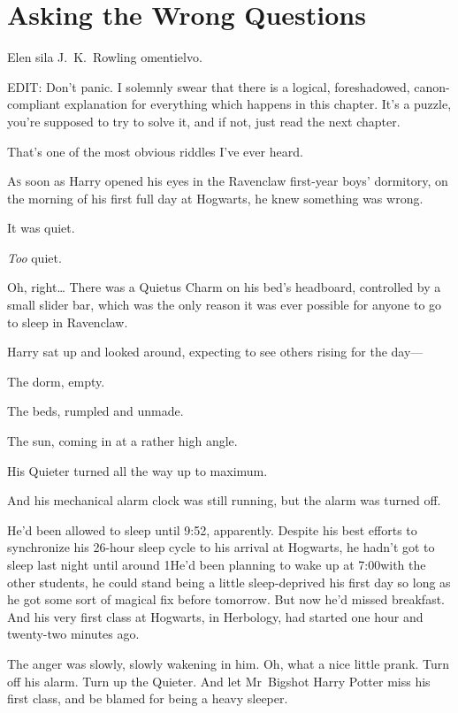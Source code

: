 \chapter{Asking the Wrong Questions}

\begin{chapterOpeningAuthorNote}
Elen sila J.~K.~Rowling omentielvo.

EDIT: Don't panic. I solemnly swear that there is a logical, foreshadowed, canon-compliant explanation for everything which happens in this chapter. It's a puzzle, you're supposed to try to solve it, and if not, just read the next chapter.
\end{chapterOpeningAuthorNote}
\begin{chapterOpeningQuote}
That's one of the most obvious riddles I've ever heard.
\end{chapterOpeningQuote}

\lettrine{A}{s} soon as Harry opened his eyes in the Ravenclaw first-year boys' dormitory, on the morning of his first full day at Hogwarts, he knew something was wrong.

It was quiet.

\emph{Too} quiet.

Oh, right{\ldots} There was a Quietus Charm on his bed's headboard, controlled by a small slider bar, which was the only reason it was ever possible for anyone to go to sleep in Ravenclaw.

Harry sat up and looked around, expecting to see others rising for the day—

The dorm, empty.

The beds, rumpled and unmade.

The sun, coming in at a rather high angle.

His Quieter turned all the way up to maximum.

And his mechanical alarm clock was still running, but the alarm was turned off.

He'd been allowed to sleep until 9:52\am, apparently. Despite his best efforts to synchronize his 26-hour sleep cycle to his arrival at Hogwarts, he hadn't got to sleep last night until around 1\am He'd been planning to wake up at 7:00\am with the other students, he could stand being a little sleep-deprived his first day so long as he got some sort of magical fix before tomorrow. But now he'd missed breakfast. And his very first class at Hogwarts, in Herbology, had started one hour and twenty-two minutes ago.

The anger was slowly, slowly wakening in him. Oh, what a nice little prank. Turn off his alarm. Turn up the Quieter. And let Mr~Bigshot Harry Potter miss his first class, and be blamed for being a heavy sleeper.

